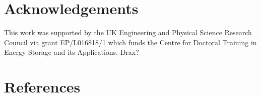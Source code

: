 \documentclass[preprint,3p,review,authoryear,10pt]{elsarticle}
\begin{document}
\section{Acknowledgements}

This work was supported by the UK Engineering and Physical Science Research Council via grant EP/L016818/1 which funds the Centre for Doctoral Training in Energy Storage and its Applications. Drax?


\section*{References}


\end{document}
